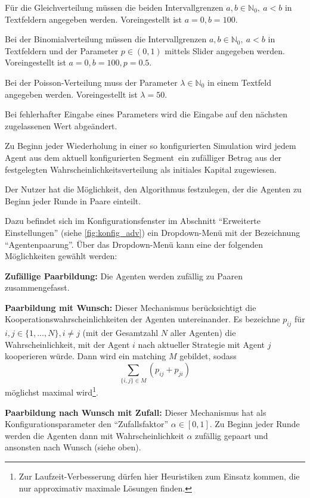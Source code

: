 \documentclass[parskip=full,11pt]{scrartcl}
\def\segment{Segment}
\begin{document}
Für die Gleichverteilung müssen die beiden Intervallgrenzen \(a,b \in \mathbb{N}_0, \ a < b\) in Textfeldern angegeben werden. Voreingestellt ist \(a = 0, b = 100\).

Bei der Binomialverteilung müssen die Intervallgrenzen \(a,b \in \mathbb{N}_0, \ a < b\) in Textfeldern und der Parameter \(p \in (0,1)\) mittels Slider angegeben werden. Voreingestellt ist \(a = 0, b = 100, p = 0.5\).

Bei der Poisson-Verteilung muss der Parameter \(\lambda \in \mathbb{N}_0\) in einem Textfeld angegeben werden. Voreingestellt ist \(\lambda = 50\).

Bei fehlerhafter Eingabe eines Parameters wird die Eingabe auf den nächsten zugelassenen Wert abgeändert.

Zu Beginn jeder Wiederholung in einer so konfigurierten Simulation wird jedem Agent aus dem aktuell konfigurierten \segment\ ein zufälliger Betrag aus der festgelegten Wahrscheinlichkeitsverteilung als initiales Kapital zugewiesen.


Der \Gls{Nutzer} hat die Möglichkeit, den Algorithmus festzulegen, der die Agenten zu Beginn jeder Runde in Paare einteilt.

Dazu befindet sich im Konfigurationsfenster im Abschnitt \enquote{Erweiterte Einstellungen} (siehe \cref{fig:konfig_adv}) ein Dropdown-Menü mit der Bezeichnung \enquote{Agentenpaarung}. Über das Dropdown-Menü kann eine der folgenden Möglichkeiten gewählt werden:

\textbf{Zufällige Paarbildung:}
Die Agenten werden zufällig zu Paaren zusammengefasst.

\textbf{Paarbildung mit Wunsch:}
Dieser Mechanismus berücksichtigt die Kooperationswahrscheinlichkeiten der Agenten untereinander. Es bezeichne \(p_{ij}\) für \(i,j \in \{1,...,N\}, i \neq j\) (mit der Gesamtzahl \(N\) aller Agenten) die Wahrscheinlichkeit, mit der Agent \(i\) nach aktueller \Gls{Strategie} mit Agent \(j\) kooperieren würde. Dann wird ein \Gls{matching} \(M\) gebildet, sodass
\[
\sum_{\{i,j\} \in M} \left(p_{ij} + p_{ji}\right)
\]
möglichst maximal wird\footnote{Zur Laufzeit-Verbesserung dürfen hier Heuristiken zum Einsatz kommen, die nur approximativ maximale Lösungen finden.}.

\textbf{Paarbildung nach Wunsch mit Zufall:}
Dieser Mechanismus hat als Konfigurationsparameter den \enquote{Zufallsfaktor} \(\alpha \in [0,1]\). Zu Beginn jeder Runde werden die Agenten dann mit Wahrscheinlichkeit \(\alpha\) zufällig gepaart und ansonsten nach Wunsch (siehe oben).
\end{document}
